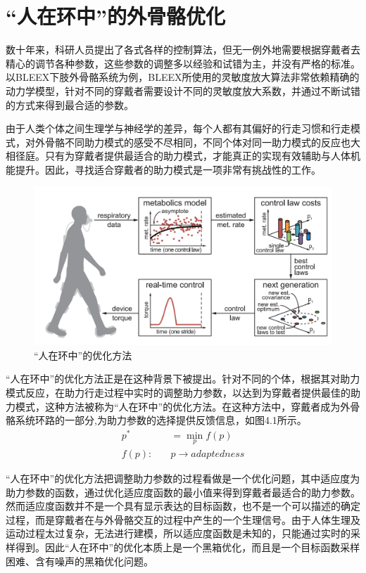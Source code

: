\chapter{“人在环中”的外骨骼优化}

数十年来，科研人员提出了各式各样的控制算法，但无一例外地需要根据穿戴者去精心的调节各种参数，这些参数的调整多以经验和试错为主，并没有严格的标准。以BLEEX下肢外骨骼系统为例，BLEEX所使用的灵敏度放大算法非常依赖精确的动力学模型，针对不同的穿戴者需要设计不同的灵敏度放大系数，并通过不断试错的方式来得到最合适的参数。

由于人类个体之间生理学与神经学的差异，每个人都有其偏好的行走习惯和行走模式，对外骨骼不同助力模式的感受不尽相同，不同个体对同一助力模式的反应也大相径庭。只有为穿戴者提供最适合的助力模式，才能真正的实现有效辅助与人体机能提升。因此，寻找适合穿戴者的助力模式是一项非常有挑战性的工作。

\begin{figure}[!htb]
    \includegraphics[width=15cm]{fig/f60.jpg}
    \caption{“人在环中”的优化方法\cite{p40}}
    \label{fig:mark}
\end{figure}

“人在环中”的优化方法正是在这种背景下被提出。针对不同的个体，根据其对助力模式反应，在助力行走过程中实时的调整助力参数，以达到为穿戴者提供最佳的助力模式，这种方法被称为“人在环中”的优化方法。在这种方法中，穿戴者成为外骨骼系统环路的一部分,为助力参数的选择提供反馈信息，如图4.1所示。
\begin{align}
    p^{*} & = \mathop{min}\limits_{p} f(p) \\
    f(p):\quad &p \to adaptedness
\end{align}

“人在环中”的优化方法把调整助力参数的过程看做是一个优化问题，其中适应度为助力参数的函数，通过优化适应度函数的最小值来得到穿戴者最适合的助力参数。然而适应度函数并不是一个具有显示表达的目标函数，也不是一个可以描述的确定过程，而是穿戴者在与外骨骼交互的过程中产生的一个生理信号。由于人体生理及运动过程太过复杂，无法进行建模，所以适应度函数是未知的，只能通过实时的采样得到。因此“人在环中”的优化本质上是一个黑箱优化，而且是一个目标函数采样困难、含有噪声的黑箱优化问题。

